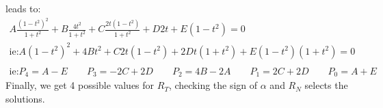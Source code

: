 leads to:
\begin{equation}
\label{eq_quartic13}
\begin{array}{l}
  A\frac{(1-t^2)^2}{1+t^2} +B\frac{4t^2}{1+t^2}+ C\frac{2t(1-t^2)}{1+t^2}+D2t+E(1-t^2)=0\\
\textrm{ie:}A(1-t^2)^2 + 4Bt^2+C2t(1-t^2)+2Dt(1+t^2)+E(1-t^2)(1+t^2)=0\\\\
\textrm{ie:}P_4=A-E\qquad P_3=-2C+2D \qquad P_2=4B-2A \qquad P_1=2C+2D \qquad P_0=A+E
 \end{array}
\end{equation}
Finally, we get 4 possible values for $R_T$, checking the sign of $\alpha$ and $R_N$ selects the solutions.
